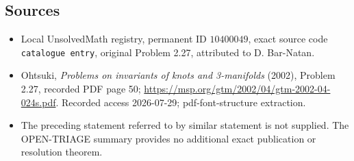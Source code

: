 \documentclass[11pt]{article}
\begin{document}
\subsection{Sources}
\begin{itemize}
\item Local UnsolvedMath registry, permanent ID \(10400049\), exact source code \texttt{catalogue entry}, original Problem 2.27, attributed to D. Bar-Natan.
\item Ohtsuki, \emph{Problems on invariants of knots and 3-manifolds} (2002), Problem 2.27, recorded PDF page 50; \url{https://msp.org/gtm/2002/04/gtm-2002-04-024s.pdf}. Recorded access 2026-07-29; pdf-font-structure extraction.
\item The preceding statement referred to by similar statement is not supplied. The OPEN-TRIAGE summary provides no additional exact publication or resolution theorem.
\end{itemize}
\end{document}
